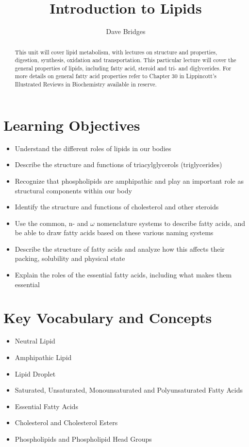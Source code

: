 \documentclass{tufte-handout}
\title{Introduction to Lipids}
\author{Dave Bridges}
\begin{document}
\maketitle%

\begin{abstract}
\noindent This unit will cover lipid metabolism, with lectures on structure and properties, digestion, synthesis, oxidation and transportation.  This particular lecture will cover the general properties of lipids, including fatty acid, steroid and tri- and diglycerides.  For more details on general fatty acid properties refer to Chapter 30 in Lippincott's Illustrated Reviews in Biochemistry available in reserve\cite{Ferrier2017}.
\end{abstract}

\tableofcontents

\pagebreak{}
\section{Learning Objectives}

\begin{itemize}
\item Understand the different roles of lipids in our bodies
\item Describe the structure and functions of triacylglycerols (triglycerides)
\item Recognize that phospholipids are amphipathic and play an important role as structural components within our body
\item Identify the structure and functions of cholesterol and other steroids
\item Use the common, n- and $\omega$ nomenclature systems to describe fatty acids, and be able to draw fatty acids based on these various naming systems
\item Describe the structure of fatty acids and analyze how this affects their packing, solubility and physical state
\item Explain the roles of the essential fatty acids, including what makes them essential

\end{itemize}

\section{Key Vocabulary and Concepts}

\begin{itemize}
\item Neutral Lipid
\item Amphipathic Lipid
\item Lipid Droplet
\item Saturated, Unsaturated, Monounsaturated and Polyunsaturated Fatty Acids
\item Essential Fatty Acids
\item Cholesterol and Cholesterol Esters
\item Phospholipids and Phospholipid Head Groups

\end{itemize}
\end{document}
